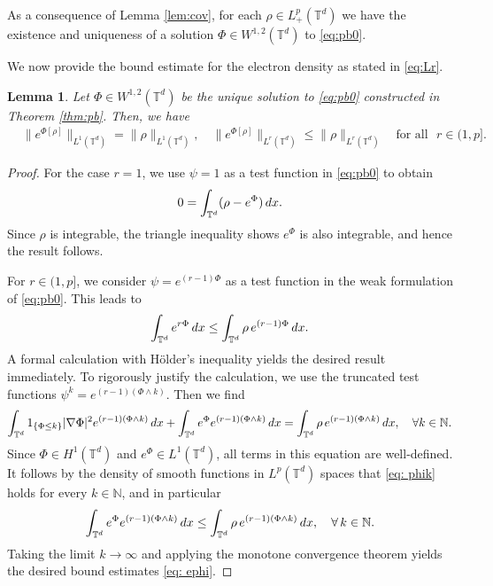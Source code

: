 \documentclass[11pt,reqno,a4paper]{amsart}
\newcommand{\intt}{\int_{\T^d}}
\newtheorem{lemma}{Lemma}[section]
\theoremstyle{definition}
\theoremstyle{remark}
\numberwithin{equation}{section}
\newcommand{\T} {\mathbb T}
\newcommand{\bq}{\begin{equation}}
\newcommand{\eq}{\end{equation}}
\newcommand{\bbN}{\mathbb N}
\newcommand{\dx}{\textnormal{d}x}
\begin{document}
As a consequence of Lemma \ref{lem:cov}, for each $\rho \in L^p_+(\T^d)$ we have the existence and uniqueness of a solution $\Phi\in W^{1,2}(\T^d)$ to \eqref{eq:pb0}. 

We now provide the bound estimate for the electron density as stated in \eqref{eq:Lr}.

\begin{lemma} Let $\Phi\in W^{1,2}(\T^d)$ be the unique solution  to \eqref{eq:pb0} constructed in Theorem \ref{thm:pb}. Then, we have
\bq
\label{eq:Lr2}
\begin{split}
&\|e^{\Phi[\rho]}\|_{L^1(\T^d)} = \|\rho\|_{L^1(\T^d)}, \quad \|e^{\Phi[\rho]}\|_{L^r(\T^d)}\le \|\rho\|_{L^r(\T^d)}\quad\text{for all}\,\,\,\,r\in(1,p].
\end{split}
\eq
\end{lemma}
\begin{proof}
For the case $r=1$, we use $\psi=1$ as a test function in \eqref{eq:pb0} to obtain
\begin{align*}
    0 = \int_{\T^d} (\rho - e^{\Phi})\,\dx.
\end{align*}
Since $\rho$ is integrable, the triangle inequality shows $e^{\Phi}$ is also integrable, and hence the result follows.

For $r\in (1,p]$, we consider $\psi = e^{(r-1)\Phi}$ as a test function in the weak formulation of \eqref{eq:pb0}. This leads to
\begin{align}\label{eq: ephi}
    \intt e^{r\Phi} \, \dx \le \intt \rho\, e^{(r-1)\Phi} \, \dx.
\end{align}
A formal calculation with H\"older's inequality yields the desired result immediately. To rigorously justify the calculation, we use the truncated test functions $\psi^k = e^{(r-1)(\Phi \wedge k)}$. Then we find
\begin{align} \label{eq: phik}
    \int_{\T^d} 1_{\{\Phi \le k\}} |\nabla \Phi|^2 e^{(r-1)(\Phi\wedge k)} \,\dx +\int_{\T^d} e^{\Phi} e^{(r-1)(\Phi\wedge k)}\,\dx = \int_{\T^d} \rho \, e^{(r-1)(\Phi \wedge k)}\,\dx, \quad \forall k\in \bbN. 
\end{align}
Since $\Phi\in H^1(\T^d)$ and $e^\Phi \in L^1(\T^d)$, all terms in this equation are well-defined. It follows by the density of smooth functions in $L^p(\T^d)$ spaces that \eqref{eq: phik} holds for every $k\in \bbN$, and in particular
\begin{align*}
    \int_{\T^d} e^{\Phi}e^{(r-1)(\Phi\wedge k)}\,\dx \le \int_{\T^d} \rho \, e^{(r-1)(\Phi\wedge k)}\,\dx, \quad \forall \, k\in \bbN.
\end{align*}
Taking the limit $k\to\infty$ and applying the monotone convergence theorem yields the desired bound estimates \eqref{eq: ephi}. 
\end{proof}
 
\end{document}
